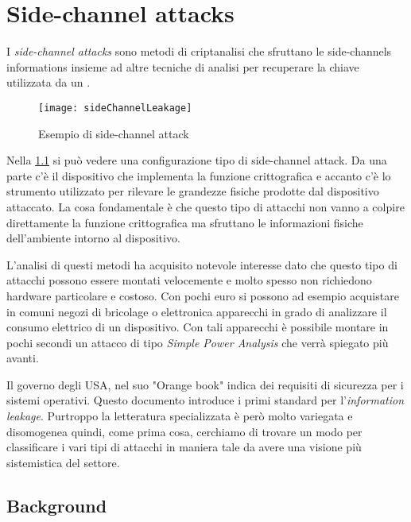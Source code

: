 \chapter{Side-channel attacks}

	I \emph{side-channel attacks} sono metodi di criptanalisi che sfruttano le side-channels informations insieme ad altre tecniche di analisi per recuperare la chiave utilizzata da un \disps\cite{standaert2010introduction}.\begin{figure}
		
		\begin{center}
			\texttt{[image: sideChannelLeakage]}
			\caption{Esempio di side-channel attack}
			\label{fig:attack}
		\end{center}
	\end{figure}
	
	Nella \cref{fig:attack} si può vedere una configurazione tipo di side-channel attack. Da una parte c'è il dispositivo che implementa la funzione crittografica e accanto c'è lo strumento utilizzato per rilevare le grandezze fisiche prodotte dal dispositivo attaccato. La cosa fondamentale è che questo tipo di attacchi non vanno a colpire direttamente la funzione crittografica ma sfruttano le informazioni fisiche dell'ambiente intorno al dispositivo.
	
	L'analisi di questi metodi ha acquisito notevole interesse dato che questo tipo di attacchi possono essere montati velocemente e molto spesso non richiedono hardware particolare e costoso. Con pochi euro si possono ad esempio acquistare in comuni negozi di bricolage o elettronica apparecchi in grado di analizzare il consumo elettrico di un dispositivo. Con tali apparecchi è possibile montare in pochi secondi un attacco di tipo \emph{Simple Power Analysis}\cite{mangard2002simple} che verrà spiegato più avanti. 
	
	Il governo degli USA, nel suo "Orange book"\cite{latham1986department} indica dei requisiti di sicurezza per i sistemi operativi. Questo documento introduce i primi standard per l'\emph{information leakage}. Purtroppo la letteratura specializzata è però molto variegata e disomogenea quindi, come prima cosa, cerchiamo di trovare un modo per classificare i vari tipi di attacchi in maniera tale da avere una visione più sistemistica del settore.
	
	\section{Background}
	

